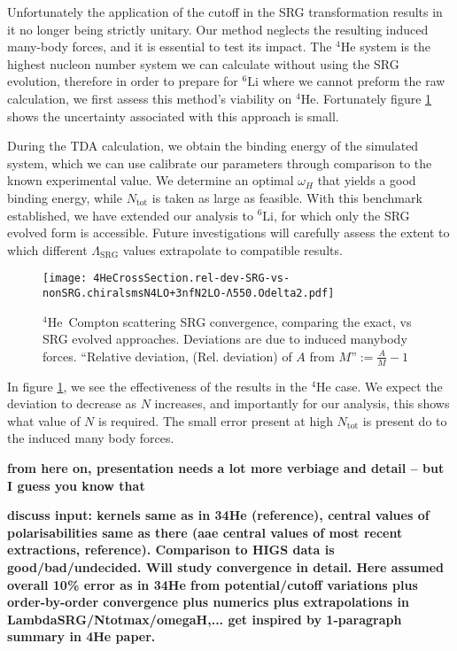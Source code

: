 \documentclass[a4paper,11pt]{article}
\newcommand{\Ntot}{N_{\mathrm{tot}}}
\newcommand{\LamSRG}{\Lambda_{\mathrm{SRG}}}
\newcommand{\LiS}{{}^{6} \mathrm{Li} }
\newcommand{\HeF}{{}^{4} \mathrm{He}}
\newcommand{\com}[1]{\color{blue}\small\textbf{ #1 }\color{black}\normalsize}
\begin{document}
Unfortunately the application of the cutoff in the SRG transformation results in it no longer being strictly unitary. 
Our method neglects the resulting induced many-body  forces, and it is essential to test its impact.
The $\HeF$ system is the highest nucleon number system we can calculate without using the SRG evolution, therefore in order to prepare for $\LiS$ where we cannot preform the raw calculation, we first assess this method's viability on $\HeF$. 
Fortunately figure \ref{fig:SRGConverge4He} shows the uncertainty associated with this approach is small.

During the TDA calculation, we obtain the binding energy of the simulated system, which we can use calibrate our parameters through comparison to the known experimental value.
We determine an optimal $\omega_H$ that yields a good binding energy, while $\Ntot$ is taken as large as feasible.
With this benchmark established, we have extended our analysis to $\LiS$, for which only the SRG evolved form is accessible.
Future investigations \cite{upcoming} will carefully assess the extent to which different $\LamSRG$ values extrapolate to compatible results.


\begin{figure}[H]
  \begin{center}
    \texttt{[image: 
    4HeCrossSection.rel-dev-SRG-vs-nonSRG.chiralsmsN4LO+3nfN2LO-Λ550.Odelta2.pdf]}
    \caption{$\HeF$\, Compton scattering SRG convergence, comparing the exact, vs SRG evolved approaches. Deviations are due to induced manybody forces. ``Relative deviation, (Rel. deviation) of $A$ from $M$''$:= \frac{A}{M}-1$}
    \label{fig:SRGConverge4He}
  \end{center}
\end{figure}
In figure \ref{fig:SRGConverge4He}, we see the effectiveness of the
results in the $\HeF$ case.
We expect the deviation to decrease as $N$ increases, and importantly
for our analysis, this shows what value of $N$ is required.
The small error present at high $\Ntot$ is present do to the induced many body forces.

\com{from here on, presentation needs a lot more verbiage and detail -- but I guess you know that}

\com{discuss input: kernels same as in 34He (reference), central values of polarisabilities same as there (aae central values of most recent extractions, reference). Comparison to HIGS data is good/bad/undecided. Will study convergence in detail. Here assumed overall 10\% error as in 34He from potential/cutoff variations plus order-by-order convergence plus numerics plus extrapolations in LambdaSRG/Ntotmax/omegaH,... get inspired by 1-paragraph summary in 4He paper. }
\end{document}
